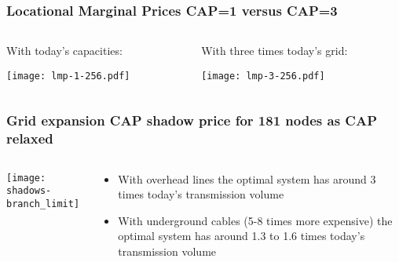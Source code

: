\documentclass[10pt,aspectratio=169,dvipsnames]{beamer}
\let\olditem\item
\renewcommand{\item}{%
\olditem\vspace{5pt}}
\begin{document}
\begin{frame}
  \frametitle{Locational Marginal Prices CAP=1 versus CAP=3}



  \begin{columns}[T]

\begin{column}{8cm}

  \hspace{1cm}  With today's capacities:

  \texttt{[image: lmp-1-256.pdf]}

\end{column}
\begin{column}{8cm}

  \hspace{1cm}With three times today's grid:

  \texttt{[image: lmp-3-256.pdf]}

\end{column}

\end{columns}


\end{frame}




\begin{frame}
  \frametitle{Grid expansion CAP shadow price for 181 nodes as CAP relaxed}


\begin{columns}[T]
\begin{column}{10cm}
\centering
  \texttt{[image: shadows-branch\_limit]}
\end{column}
\begin{column}{4cm}
  \begin{itemize}
  \item With overhead lines the optimal system has around 3 times today's transmission volume
  \item With underground cables (5-8 times more expensive) the optimal system has around 1.3 to 1.6 times today's transmission volume
  \end{itemize}
\end{column}
\end{columns}

\end{frame}
\end{document}
